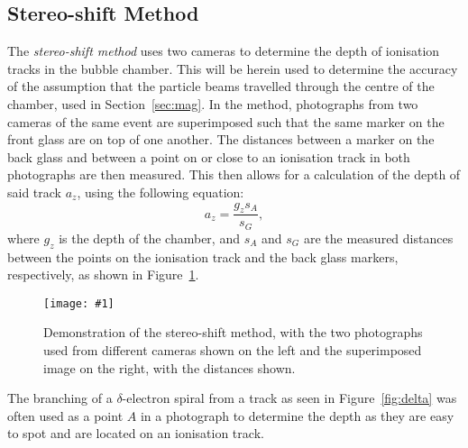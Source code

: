 \documentclass[twocolumn]{article}
\newcommand{\insertFigure}[1]{%
   \texttt{[image: \#1]}%
}
\begin{document}
\subsection{Stereo-shift Method}
The \textit{stereo-shift method} uses two cameras to determine the depth of ionisation tracks in the bubble chamber. This will be herein used to determine the accuracy of the assumption that the particle beams travelled through the centre of the chamber, used in Section~\ref{sec:mag}. In the method, photographs from two cameras of the same event are superimposed such that the same marker on the front glass are on top of one another. The distances between a marker on the back glass and between a point on or close to an ionisation track in both photographs are then measured. This then allows for a calculation of the depth of said track $a_z$, using the following equation:~\cite{seul}
\begin{equation} \label{eq:stereo}
a_z = \frac{g_z s_A}{s_G},
\end{equation}
where $g_z$ is the depth of the chamber, and $s_A$ and $s_G$ are the measured distances between the points on the ionisation track and the back glass markers, respectively, as shown in Figure~\ref{fig:stereo}.
\begin{figure}[!h]
	\centering
	\insertFigure{stereo.png}
	\caption{Demonstration of the stereo-shift method, with the two photographs used from different cameras shown on the left and the superimposed image on the right, with the distances shown.~\cite{seul}}
	\label{fig:stereo}
\end{figure}
The branching of a $\delta$-electron spiral from a track as seen in Figure~\ref{fig:delta} was often used as a point $A$ in a photograph to determine the depth as they are easy to spot and are located on an ionisation track.
\end{document}
